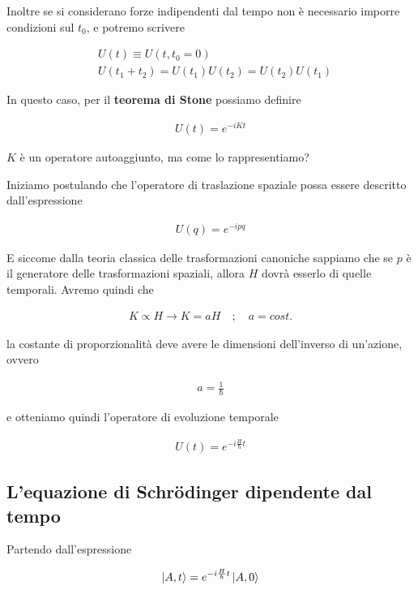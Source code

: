 Inoltre se si considerano forze indipendenti dal tempo non è necessario imporre condizioni sul $t_0$, e potremo scrivere

\begin{align}
{}&U(t)\equiv U(t,t_0=0) \\
&U(t_{1}+t_{2})=U(t_{1}) U(t_{2})=U(t_{2}) U(t_{1}) 
\end{align}

In questo caso, per il \textbf{teorema di Stone} possiamo definire 

\begin{align}
U(t)= e^{-iKt}
\end{align}

$K$ è un operatore autoaggiunto, ma come lo rappresentiamo?

Iniziamo postulando che l'operatore di traslazione spaziale possa essere descritto dall'espressione

\begin{align}
U(q)= e^{-ipq}
\end{align}

E siccome dalla teoria classica delle trasformazioni canoniche sappiamo che se $p$ è il generatore delle trasformazioni spaziali, allora $H$ dovrà esserlo di quelle temporali. Avremo quindi che

\begin{align}
K \propto H \rightarrow K = aH \quad ; \quad a=cost. 
\end{align}

la costante di proporzionalità deve avere le dimensioni dell'inverso di un'azione, ovvero

\begin{align}
a=\frac{1}{\hbar}
\end{align}

e otteniamo quindi l'operatore di evoluzione temporale

\begin{align}
U(t)= e^{-i\frac{H}{\hbar}t}
\end{align}

\newpage
\subsection{L'equazione di Schrödinger dipendente dal tempo}

Partendo dall'espressione

\begin{align}
\ket{A,t}= e^{-i\frac{H}{\hbar}t} \ket{A,0}
\end{align}

